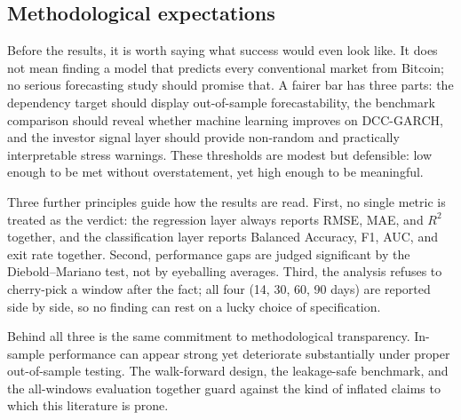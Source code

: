 \subsection{Methodological expectations}

Before the results, it is worth saying what success would even look like. It does not mean finding a model that predicts every conventional market from Bitcoin; no serious forecasting study should promise that. A fairer bar has three parts: the dependency target should display out-of-sample forecastability, the benchmark comparison should reveal whether machine learning improves on DCC-GARCH, and the investor signal layer should provide non-random and practically interpretable stress warnings. These thresholds are modest but defensible: low enough to be met without overstatement, yet high enough to be meaningful.

Three further principles guide how the results are read. First, no single metric is treated as the verdict: the regression layer always reports RMSE, MAE, and $R^2$ together, and the classification layer reports Balanced Accuracy, F1, AUC, and exit rate together. Second, performance gaps are judged significant by the Diebold--Mariano test, not by eyeballing averages. Third, the analysis refuses to cherry-pick a window after the fact; all four (14, 30, 60, 90 days) are reported side by side, so no finding can rest on a lucky choice of specification.

Behind all three is the same commitment to methodological transparency. In-sample performance can appear strong yet deteriorate substantially under proper out-of-sample testing. The walk-forward design, the leakage-safe benchmark, and the all-windows evaluation together guard against the kind of inflated claims to which this literature is prone.
